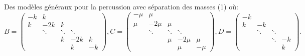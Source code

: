 \begin{frame}{Des modèles généraux pour la percussion avec séparation des masses (1)}
	où:
	\scriptsize
	$$
B =  \begin{pmatrix}
    -k & k &  &  &  \\
    k & -2k & k &  &  \\
     & \ddots & \ddots & \ddots &  \\
     &  & k & -2k & k \\
     &  &  & k & -k
    \end{pmatrix} , 
C =  \begin{pmatrix}
    -\mu & \mu &  &  &  \\
    \mu & -2\mu & \mu &  &  \\
     & \ddots & \ddots & \ddots &  \\
     &  & \mu & -2\mu & \mu \\
     &  &  & \mu & -\mu
    \end{pmatrix} , 
D =  \begin{pmatrix}
    -k &  &  &  \\
    k & -k &  &  \\
     & \ddots & \ddots &  \\
     &  & \ddots & -k \\
     &  &  & k 
    \end{pmatrix}.
	$$
    \normalsize

\end{frame}


